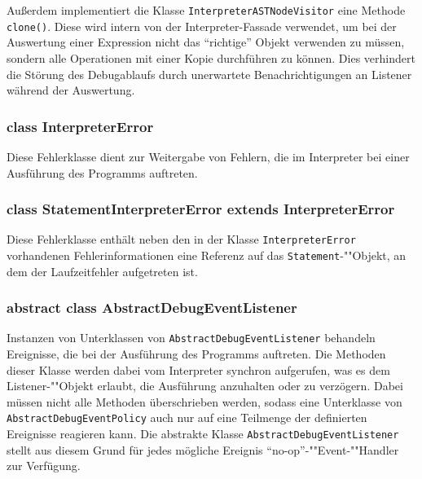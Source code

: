 Außerdem implementiert die Klasse \texttt{InterpreterASTNodeVisitor} eine Methode \texttt{clone()}. Diese wird intern von der Interpreter-Fassade verwendet, um bei der Auswertung einer Expression nicht das ``richtige'' Objekt verwenden zu müssen, sondern alle Operationen mit einer Kopie durchführen zu können. Dies verhindert die Störung des Debugablaufs durch unerwartete Benachrichtigungen an Listener während der Auswertung.

\subsubsection{class InterpreterError}
Diese Fehlerklasse dient zur Weitergabe von Fehlern, die im Interpreter bei einer Ausführung des Programms auftreten.

\subsubsection{class StatementInterpreterError extends InterpreterError}
Diese Fehlerklasse enthält neben den in der Klasse \texttt{InterpreterError} vorhandenen Fehlerinformationen eine Referenz auf das \texttt{Statement}-""Objekt, an dem der Laufzeitfehler aufgetreten ist.

\subsubsection{abstract class AbstractDebugEventListener}
Instanzen von Unterklassen von \texttt{AbstractDebugEventListener} behandeln Ereignisse, die bei der Ausführung des Programms auftreten. Die Methoden dieser Klasse werden dabei vom Interpreter synchron aufgerufen, was es dem Listener-""Objekt erlaubt, die Ausführung anzuhalten oder zu verzögern. Dabei müssen nicht alle Methoden überschrieben werden, sodass eine Unterklasse von \texttt{AbstractDebugEventPolicy} auch nur auf eine Teilmenge der definierten Ereignisse reagieren kann. Die abstrakte Klasse \texttt{AbstractDebugEventListener} stellt aus diesem Grund für jedes mögliche Ereignis ``no-op''-""Event-""Handler zur Verfügung.

